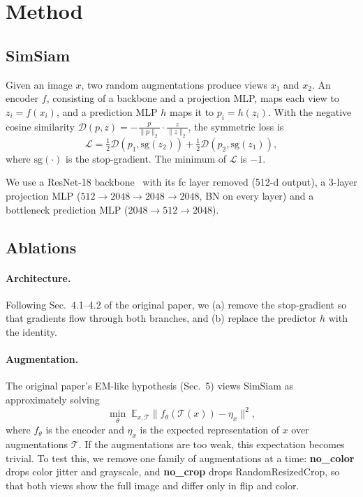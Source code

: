 \documentclass[10pt,twocolumn,letterpaper]{article}
\begin{document}
\section{Method}
\label{sec:method}

\subsection{SimSiam}
Given an image $x$, two random augmentations produce views $x_1$ and $x_2$.
An encoder $f$, consisting of a backbone and a projection MLP, maps each view to $z_i=f(x_i)$, and a prediction MLP $h$ maps it to $p_i=h(z_i)$.
With the negative cosine similarity $\mathcal{D}(p,z)=-\frac{p}{\|p\|_2}\cdot\frac{z}{\|z\|_2}$, the symmetric loss is
\begin{equation}
\mathcal{L}=\tfrac12\mathcal{D}(p_1,\text{sg}(z_2))+\tfrac12\mathcal{D}(p_2,\text{sg}(z_1)),
\label{eq:loss}
\end{equation}
where $\text{sg}(\cdot)$ is the stop-gradient. The minimum of $\mathcal{L}$ is $-1$.

We use a ResNet-18 backbone~\cite{he2016resnet} with its fc layer removed (512-d output), a 3-layer projection MLP ($512\!\to\!2048\!\to\!2048\!\to\!2048$, BN on every layer) and a bottleneck prediction MLP ($2048\!\to\!512\!\to\!2048$).

\subsection{Ablations}
\paragraph{Architecture.}
Following Sec.~4.1--4.2 of the original paper, we (a) remove the stop-gradient so that gradients flow through both branches, and (b) replace the predictor $h$ with the identity.

\paragraph{Augmentation.}
The original paper's EM-like hypothesis (Sec.~5) views SimSiam as approximately solving
\begin{equation}
\min_\theta\; \mathbb{E}_{x,\mathcal{T}}\bigl\|f_\theta(\mathcal{T}(x))-\eta_x\bigr\|^2,
\label{eq:em}
\end{equation}
where $f_\theta$ is the encoder and $\eta_x$ is the expected representation of $x$ over augmentations $\mathcal{T}$.
If the augmentations are too weak, this expectation becomes trivial.
To test this, we remove one family of augmentations at a time:
\textbf{no\_color} drops color jitter and grayscale, and \textbf{no\_crop} drops RandomResizedCrop, so that both views show the full image and differ only in flip and color.
\end{document}
